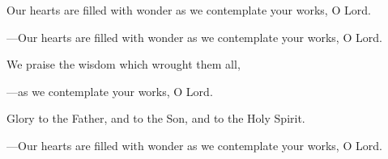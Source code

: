 \responsory
\begin{hangpar}

Our hearts are filled with wonder as we contemplate your works, O Lord.

{\color{red}---\thinspace}Our hearts are filled with wonder as we contemplate your works, O Lord.

\medskip We praise the wisdom which wrought them all,

{\color{red}---\thinspace}as we contemplate your works, O Lord.

\medskip Glory to the Father, and to the Son, and to the Holy Spirit.

{\color{red}---\thinspace}Our hearts are filled with wonder as we contemplate your works, O Lord.
\end{hangpar}
